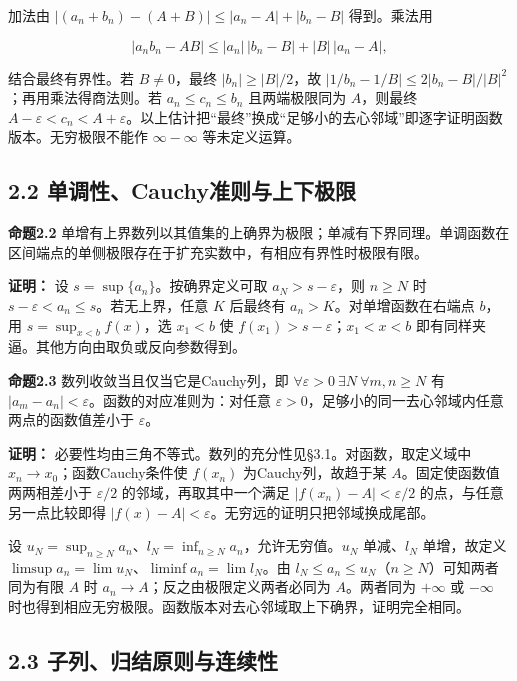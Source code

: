 \documentclass[11pt,a4paper]{article}
\begin{document}
加法由 \(|(a_n+b_n)-(A+B)|\le|a_n-A|+|b_n-B|\) 得到。乘法用

\[
|a_nb_n-AB|\le |a_n|\,|b_n-B|+|B|\,|a_n-A|,
\]

结合最终有界性。若 \(B\ne0\)，最终 \(|b_n|\ge|B|/2\)，故
\(|1/b_n-1/B|\le2|b_n-B|/|B|^2\)；再用乘法得商法则。若
\(a_n\le c_n\le b_n\) 且两端极限同为 \(A\)，则最终
\(A-\varepsilon<c_n<A+\varepsilon\)。以上估计把``最终''换成``足够小的去心邻域''即逐字证明函数版本。无穷极限不能作
\(\infty-\infty\) 等未定义运算。

\subsection{2.2
单调性、Cauchy准则与上下极限}\label{ux5355ux8c03ux6027cauchyux51c6ux5219ux4e0eux4e0aux4e0bux6781ux9650}

\textbf{命题2.2}
单增有上界数列以其值集的上确界为极限；单减有下界同理。单调函数在区间端点的单侧极限存在于扩充实数中，有相应有界性时极限有限。

\textbf{证明：} 设 \(s=\sup\{a_n\}\)。按确界定义可取
\(a_N>s-\varepsilon\)，则 \(n\ge N\) 时
\(s-\varepsilon<a_n\le s\)。若无上界，任意 \(K\) 后最终有
\(a_n>K\)。对单增函数在右端点 \(b\)，用 \(s=\sup_{x<b}f(x)\)，选
\(x_1<b\) 使 \(f(x_1)>s-\varepsilon\)；\(x_1<x<b\)
即有同样夹逼。其他方向由取负或反向参数得到。

\textbf{命题2.3} 数列收敛当且仅当它是Cauchy列，即
\(\forall\varepsilon>0\ \exists N\ \forall m,n\ge N\) 有
\(|a_m-a_n|<\varepsilon\)。函数的对应准则为：对任意
\(\varepsilon>0\)，足够小的同一去心邻域内任意两点的函数值差小于
\(\varepsilon\)。

\textbf{证明：}
必要性均由三角不等式。数列的充分性见§3.1。对函数，取定义域中
\(x_n\to x_0\)；函数Cauchy条件使 \(f(x_n)\) 为Cauchy列，故趋于某
\(A\)。固定使函数值两两相差小于 \(\varepsilon/2\)
的邻域，再取其中一个满足 \(|f(x_n)-A|<\varepsilon/2\)
的点，与任意另一点比较即得
\(|f(x)-A|<\varepsilon\)。无穷远的证明只把邻域换成尾部。

设
\(u_N=\sup_{n\ge N}a_n\)、\(l_N=\inf_{n\ge N}a_n\)，允许无穷值。\(u_N\)
单减、\(l_N\) 单增，故定义
\(\limsup a_n=\lim u_N\)、\(\liminf a_n=\lim l_N\)。由
\(l_N\le a_n\le u_N\)（\(n\ge N\)）可知两者同为有限 \(A\) 时
\(a_n\to A\)；反之由极限定义两者必同为 \(A\)。两者同为 \(+\infty\) 或
\(-\infty\)
时也得到相应无穷极限。函数版本对去心邻域取上下确界，证明完全相同。

\subsection{2.3
子列、归结原则与连续性}\label{ux5b50ux5217ux5f52ux7ed3ux539fux5219ux4e0eux8fdeux7eedux6027}
\end{document}
